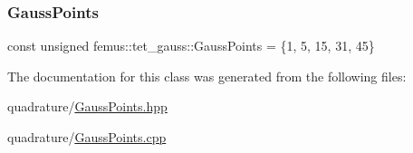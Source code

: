 \subsubsection{\texorpdfstring{Gauss\+Points}{GaussPoints}}
{\footnotesize\ttfamily const unsigned femus\+::tet\+\_\+gauss\+::\+Gauss\+Points = \{1, 5, 15, 31, 45\}\hspace{0.3cm}{\ttfamily [static]}}



The documentation for this class was generated from the following files\+:\begin{DoxyCompactItemize}
\item 
quadrature/\mbox{\hyperlink{_gauss_points_8hpp}{Gauss\+Points.\+hpp}}\item 
quadrature/\mbox{\hyperlink{_gauss_points_8cpp}{Gauss\+Points.\+cpp}}\end{DoxyCompactItemize}
